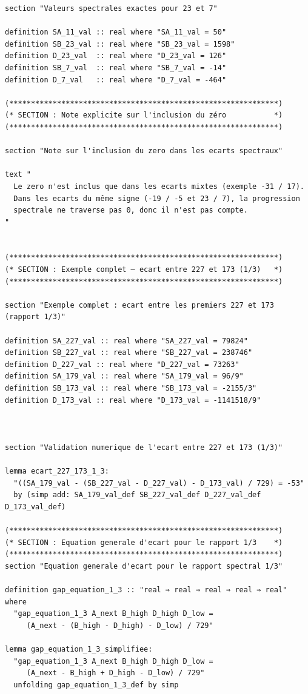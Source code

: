 \documentclass[a4paper,11pt]{article}
\begin{document}
\begin{holcode}[title={\textcolor{white}{File: methode\_spectral.thy -- Part 6/6 (END)}}]
\begin{lstlisting}
section "Valeurs spectrales exactes pour 23 et 7"

definition SA_11_val :: real where "SA_11_val = 50"
definition SB_23_val :: real where "SB_23_val = 1598"
definition D_23_val  :: real where "D_23_val = 126"
definition SB_7_val  :: real where "SB_7_val = -14"
definition D_7_val   :: real where "D_7_val = -464"

(**************************************************************)
(* SECTION : Note explicite sur l'inclusion du zéro           *)
(**************************************************************)

section "Note sur l'inclusion du zero dans les ecarts spectraux"

text "
  Le zero n'est inclus que dans les ecarts mixtes (exemple -31 / 17).
  Dans les ecarts du même signe (-19 / -5 et 23 / 7), la progression
  spectrale ne traverse pas 0, donc il n'est pas compte.
"


(**************************************************************)
(* SECTION : Exemple complet – ecart entre 227 et 173 (1/3)   *)
(**************************************************************)

section "Exemple complet : ecart entre les premiers 227 et 173 (rapport 1/3)"

definition SA_227_val :: real where "SA_227_val = 79824"
definition SB_227_val :: real where "SB_227_val = 238746"
definition D_227_val :: real where "D_227_val = 73263"
definition SA_179_val :: real where "SA_179_val = 96/9"
definition SB_173_val :: real where "SB_173_val = -2155/3"
definition D_173_val :: real where "D_173_val = -1141518/9"



section "Validation numerique de l'ecart entre 227 et 173 (1/3)"

lemma ecart_227_173_1_3:
  "((SA_179_val - (SB_227_val - D_227_val) - D_173_val) / 729) = -53"
  by (simp add: SA_179_val_def SB_227_val_def D_227_val_def D_173_val_def)

(**************************************************************)
(* SECTION : Equation generale d'ecart pour le rapport 1/3    *)
(**************************************************************)
section "Equation generale d'ecart pour le rapport spectral 1/3"

definition gap_equation_1_3 :: "real ⇒ real ⇒ real ⇒ real ⇒ real" where
  "gap_equation_1_3 A_next B_high D_high D_low =
     (A_next - (B_high - D_high) - D_low) / 729"

lemma gap_equation_1_3_simplifiee:
  "gap_equation_1_3 A_next B_high D_high D_low =
     (A_next - B_high + D_high - D_low) / 729"
  unfolding gap_equation_1_3_def by simp


\end{lstlisting}
\end{holcode}
\end{document}
